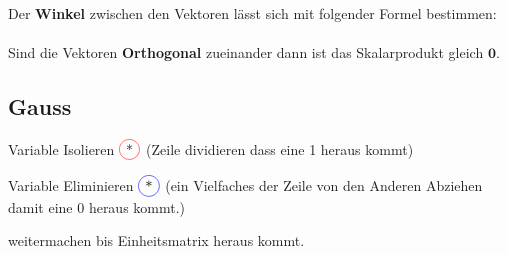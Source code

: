 Der \textbf{Winkel} zwischen den Vektoren lässt sich mit folgender Formel bestimmen:\\
\\[5pt]
Sind die Vektoren \textbf{Orthogonal} zueinander dann ist das Skalarprodukt gleich $\mathbf{0}$.



\subsection{Gauss}
\begin{compactenum}
	\item Variable Isolieren $\circledr{*}$ (Zeile dividieren dass eine 1 heraus kommt)
	\item Variable Eliminieren $\circledb{*}$ (ein Vielfaches der Zeile von den Anderen Abziehen damit eine 0 heraus kommt.)
	\item weitermachen bis Einheitsmatrix heraus kommt.
\end{compactenum}

